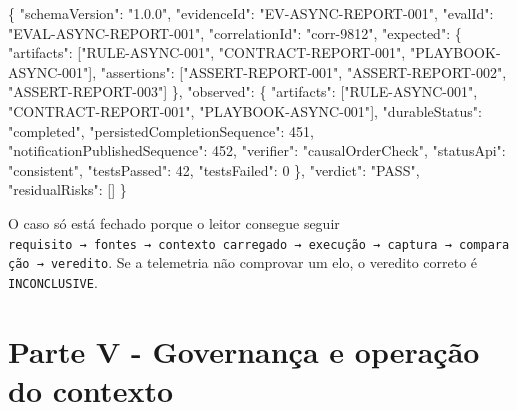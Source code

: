 \documentclass[
  10pt,
  a4paper,
  oneside]{book}
\newenvironment{Shaded}{}{}
\newcommand{\DataTypeTok}[1]{\textcolor[rgb]{0.56,0.13,0.00}{#1}}
\newcommand{\DecValTok}[1]{\textcolor[rgb]{0.25,0.63,0.44}{#1}}
\newcommand{\FunctionTok}[1]{\textcolor[rgb]{0.02,0.16,0.49}{#1}}
\newcommand{\OtherTok}[1]{\textcolor[rgb]{0.00,0.44,0.13}{#1}}
\newcommand{\StringTok}[1]{\textcolor[rgb]{0.25,0.44,0.63}{#1}}
\begin{document}
\begin{Shaded}
\begin{Highlighting}[]
\FunctionTok{\{}
  \DataTypeTok{"schemaVersion"}\FunctionTok{:} \StringTok{"1.0.0"}\FunctionTok{,}
  \DataTypeTok{"evidenceId"}\FunctionTok{:} \StringTok{"EV{-}ASYNC{-}REPORT{-}001"}\FunctionTok{,}
  \DataTypeTok{"evalId"}\FunctionTok{:} \StringTok{"EVAL{-}ASYNC{-}REPORT{-}001"}\FunctionTok{,}
  \DataTypeTok{"correlationId"}\FunctionTok{:} \StringTok{"corr{-}9812"}\FunctionTok{,}
  \DataTypeTok{"expected"}\FunctionTok{:} \FunctionTok{\{}
    \DataTypeTok{"artifacts"}\FunctionTok{:} \OtherTok{[}\StringTok{"RULE{-}ASYNC{-}001"}\OtherTok{,} \StringTok{"CONTRACT{-}REPORT{-}001"}\OtherTok{,} \StringTok{"PLAYBOOK{-}ASYNC{-}001"}\OtherTok{]}\FunctionTok{,}
    \DataTypeTok{"assertions"}\FunctionTok{:} \OtherTok{[}\StringTok{"ASSERT{-}REPORT{-}001"}\OtherTok{,} \StringTok{"ASSERT{-}REPORT{-}002"}\OtherTok{,} \StringTok{"ASSERT{-}REPORT{-}003"}\OtherTok{]}
  \FunctionTok{\},}
  \DataTypeTok{"observed"}\FunctionTok{:} \FunctionTok{\{}
    \DataTypeTok{"artifacts"}\FunctionTok{:} \OtherTok{[}\StringTok{"RULE{-}ASYNC{-}001"}\OtherTok{,} \StringTok{"CONTRACT{-}REPORT{-}001"}\OtherTok{,} \StringTok{"PLAYBOOK{-}ASYNC{-}001"}\OtherTok{]}\FunctionTok{,}
    \DataTypeTok{"durableStatus"}\FunctionTok{:} \StringTok{"completed"}\FunctionTok{,}
    \DataTypeTok{"persistedCompletionSequence"}\FunctionTok{:} \DecValTok{451}\FunctionTok{,}
    \DataTypeTok{"notificationPublishedSequence"}\FunctionTok{:} \DecValTok{452}\FunctionTok{,}
    \DataTypeTok{"verifier"}\FunctionTok{:} \StringTok{"causalOrderCheck"}\FunctionTok{,}
    \DataTypeTok{"statusApi"}\FunctionTok{:} \StringTok{"consistent"}\FunctionTok{,}
    \DataTypeTok{"testsPassed"}\FunctionTok{:} \DecValTok{42}\FunctionTok{,}
    \DataTypeTok{"testsFailed"}\FunctionTok{:} \DecValTok{0}
  \FunctionTok{\},}
  \DataTypeTok{"verdict"}\FunctionTok{:} \StringTok{"PASS"}\FunctionTok{,}
  \DataTypeTok{"residualRisks"}\FunctionTok{:} \OtherTok{[]}
\FunctionTok{\}}
\end{Highlighting}
\end{Shaded}

O caso só está fechado porque o leitor consegue seguir
\texttt{requisito\ →\ fontes\ →\ contexto\ carregado\ →\ execução\ →\ captura\ →\ comparação\ →\ veredito}.
Se a telemetria não comprovar um elo, o veredito correto é
\texttt{INCONCLUSIVE}.

\newpage

\hypertarget{parte-v---governanuxe7a-e-operauxe7uxe3o-do-contexto}{%
\chapter{Parte V - Governança e operação do
contexto}\label{parte-v---governanuxe7a-e-operauxe7uxe3o-do-contexto}}
\end{document}
